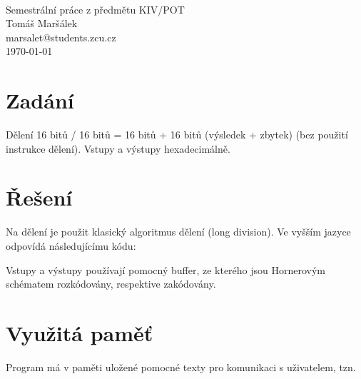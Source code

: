 \documentclass[11pt]{article}
\begin{document}
\begin{titlepage}
\begin{center}
	\mbox{} \\[3cm]
	\huge{Semestrální práce z předmětu KIV/POT} \\[2.5cm]
	\Large{Tomáš Maršálek} \\
	\large{marsalet@students.zcu.cz} \\[1cm]
	\normalsize{\today}
\end{center}
\thispagestyle{empty}
\end{titlepage}

\section{Zadání}
Dělení 16 bitů / 16 bitů = 16 bitů + 16 bitů (výsledek + zbytek) (bez použití
instrukce dělení). Vstupy a výstupy hexadecimálně.

\section{Řešení}
Na dělení je použit klasický algoritmus dělení (long division). Ve vyšším
jazyce odpovídá následujícímu kódu:

Vstupy a výstupy používají pomocný buffer, ze kterého jsou Hornerovým schématem
rozkódovány, respektive zakódovány.

\section{Využitá paměť}
Program má v paměti uložené pomocné texty pro komunikaci s uživatelem, tzn. 
\end{document}

